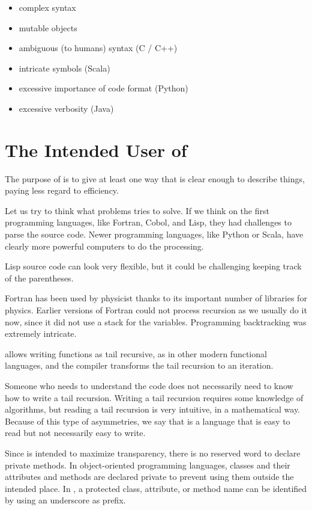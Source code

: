 \begin{itemize}
    \item complex syntax
    \item mutable objects
    \item ambiguous (to humans) syntax (C / C++)
    \item intricate symbols (Scala)
    \item excessive importance of code format (Python)
    \item excessive verbosity (Java)
\end{itemize}


\section{The Intended User of \Soda}

The purpose of \Soda is to give at least one way that is clear enough to describe things, paying less regard to efficiency.

Let us try to think what problems \Soda tries to solve.
If we think on the first programming languages, like Fortran, Cobol, and Lisp, they had challenges to parse the source code.
Newer programming languages, like Python or Scala, have clearly more powerful computers to do the processing.

Lisp source code can look very flexible, but it could be challenging keeping track of the parentheses.

Fortran has been used by physicist thanks to its important number of libraries for physics.
Earlier versions of Fortran could not process recursion as we usually do it now, since it did not use a stack for the variables.
Programming backtracking was extremely intricate.

\Soda allows writing functions as tail recursive, as in other modern functional languages, and the compiler transforms the tail recursion to an iteration.

Someone who needs to understand the code does not necessarily need to know how to write a tail recursion.
Writing a tail recursion requires some knowledge of algorithms, but reading a tail recursion is very intuitive, in a mathematical way.
Because of this type of asymmetries, we say that \Soda is a language that is easy to read but not necessarily easy to write.

Since \Soda is intended to maximize transparency, there is no reserved word to declare private methods.
In object-oriented programming languages, classes and their attributes and methods are declared private to prevent using them outside the intended place.
In \Soda, a protected class, attribute, or method name can be identified by using an underscore as prefix.


